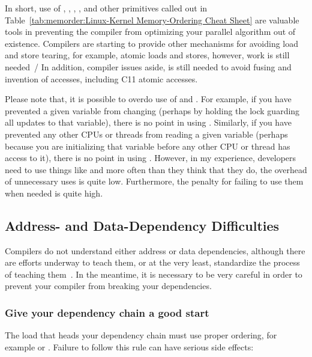 In short, use of , , ,
, and other primitives called out in
Table~\ref{tab:memorder:Linux-Kernel Memory-Ordering Cheat Sheet}
are valuable tools in preventing the compiler from
optimizing your parallel algorithm out of existence.
Compilers are starting to provide other mechanisms for avoiding
load and store tearing, for example, 
atomic loads and stores, however, work is still
needed~/\cite{JonathanCorbet2016C11atomics}
In addition, compiler issues aside,  is still needed
to avoid fusing and invention of accesses, including C11 atomic accesses.

Please note that, it is possible to overdo use of  and
.
For example, if you have prevented a given variable from changing
(perhaps by holding the lock guarding all updates to that
variable), there is no point in using .
Similarly, if you have prevented any other CPUs or threads from
reading a given variable (perhaps because you are initializing
that variable before any other CPU or thread has access to it),
there is no point in using .
However, in my experience, developers need to use things like
 and  more often than they think that
they do, the overhead of unnecessary uses is quite low.
Furthermore, the penalty for failing to use them when needed is quite high.

\subsection{Address- and Data-Dependency Difficulties}
\label{sec:memorder:Address- and Data-Dependency Difficulties}

Compilers do not understand either address or data dependencies,
although there are efforts underway to teach them, or at the very
least, standardize the process of teaching
them~\cite{PaulEMcKennneyConsumeP0190R4,PaulEMcKenney2017markconsumeP0462R1}.
In the meantime, it is necessary to be very careful in order to prevent
your compiler from breaking your dependencies.

\subsubsection{Give your dependency chain a good start}
The load that heads your dependency chain must use proper
ordering, for example  or .
Failure to follow this rule can have serious side effects:


